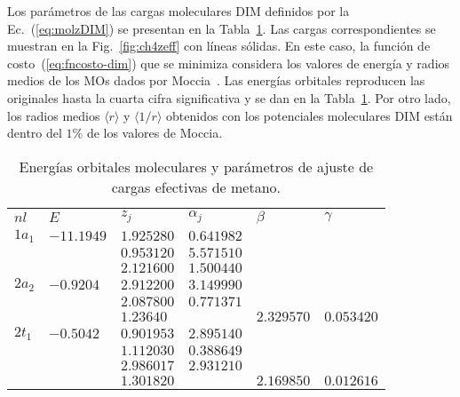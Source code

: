 Los parámetros de las cargas moleculares DIM definidos por la 
Ec.~(\ref{eq:molzDIM}) se presentan en la Tabla~\ref{tab:ch4parameters}. 
Las cargas correspondientes se muestran en la Fig.~\ref{fig:ch4zeff} con 
líneas sólidas. En este caso, la función de costo~(\ref{eq:fncosto-dim}) 
que se minimiza considera los valores de energía y radios medios de los 
MOs dados por Moccia~\cite{Moccia:69}. Las energías orbitales reproducen 
las originales hasta la cuarta cifra significativa y se dan en la 
Tabla~\ref{tab:ch4parameters}. Por otro lado, los radios medios 
$\langle r\rangle$ y $\langle 1/r\rangle$ obtenidos con los potenciales 
moleculares DIM están dentro del $1\%$ de los valores de Moccia.

\begin{table}[t]
\centering
\begin{tabular}{
>{\centering\arraybackslash}p{}
>{\centering\arraybackslash}p{}
>{\centering\arraybackslash}p{}
>{\centering\arraybackslash}p{}
>{\centering\arraybackslash}p{}
>{\centering\arraybackslash}p{}}
\rowcolor{mydarkgray} 
   $nl$ & $E$        & $z_j$        & $\alpha_j$   & $\beta$ & $\gamma$ \\
$1a_1$  & $-11.1949$ & $1.925280$ & $0.641982$ & & \\
\rowcolor{mygray} 
        &            & $0.953120$ & $5.571510$ & & \\
        &            & $2.121600$ & $1.500440$ & & \\
\rowcolor{mygray} 
$2a_2$  & $-0.9204$  & $2.912200$ & $3.149990$ & & \\
        &            & $2.087800$ & $0.771371$ & & \\
\rowcolor{mygray} 
        &            & $1.23640$  &            & $2.329570$ & $0.053420$ \\
$2t_1$  & $-0.5042$  & $0.901953$ & $2.895140$ & & \\
\rowcolor{mygray} 
        &            & $1.112030$ & $0.388649$ & & \\
        &            & $2.986017$ & $2.931210$ & & \\
\rowcolor{mygray} 
        &            & $1.301820$ &            & $2.169850$ & $0.012616$ \\ 
\end{tabular}
\caption[Energías y parámetros de ajuste de cargas efectivas de metano.]
{Energías orbitales moleculares y parámetros de ajuste de cargas 
efectivas de metano.}
\label{tab:ch4parameters}
\end{table}

